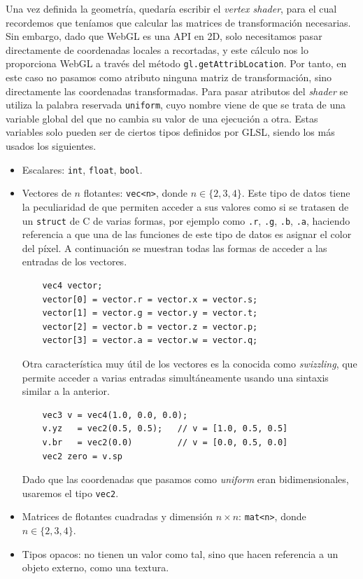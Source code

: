 Una vez definida la geometría, quedaría escribir el \textit{vertex shader}, para el cual recordemos que teníamos que calcular las matrices de transformación necesarias. Sin embargo, dado que WebGL es una API en 2D, solo necesitamos pasar directamente de coordenadas locales a recortadas, y este cálculo nos lo proporciona WebGL a través del método \texttt{gl.getAttribLocation}. Por tanto, en este caso no pasamos como atributo ninguna matriz de transformación, sino directamente las coordenadas transformadas. Para pasar atributos del \textit{shader} se utiliza la palabra reservada \texttt{uniform}, cuyo nombre viene de que se trata de una variable global del que no cambia su valor de una ejecución a otra. Estas variables solo pueden ser de ciertos tipos definidos por GLSL, siendo los más usados los siguientes.
\begin{itemize}
    \item Escalares: \texttt{int}, \texttt{float}, \texttt{bool}.
    \item Vectores de $n$ flotantes: \texttt{vec<n>}, donde $n\in \{2,3,4\}$. Este tipo de datos tiene la peculiaridad de que permiten acceder a sus valores como si se tratasen de un \texttt{struct} de C de varias formas, por ejemplo como \texttt{.r}, \texttt{.g}, \texttt{.b}, \texttt{.a}, haciendo referencia a que una de las funciones de este tipo de datos es asignar el color del píxel. A continuación se muestran todas las formas de acceder a las entradas de los vectores.
    \begin{lstlisting}
    vec4 vector;
    vector[0] = vector.r = vector.x = vector.s;
    vector[1] = vector.g = vector.y = vector.t;
    vector[2] = vector.b = vector.z = vector.p;
    vector[3] = vector.a = vector.w = vector.q;
    \end{lstlisting}
    Otra característica muy útil de los vectores es la conocida como \textit{swizzling}, que permite acceder a varias entradas simultáneamente usando una sintaxis similar a la anterior.
    \begin{lstlisting}
    vec3 v = vec4(1.0, 0.0, 0.0);
    v.yz   = vec2(0.5, 0.5);   // v = [1.0, 0.5, 0.5]
    v.br   = vec2(0.0)         // v = [0.0, 0.5, 0.0]
    vec2 zero = v.sp 
    \end{lstlisting}
    Dado que las coordenadas que pasamos como \textit{uniform} eran bidimensionales, usaremos el tipo \texttt{vec2}.
    \item Matrices de flotantes cuadradas y dimensión $n\times n$: \texttt{mat<n>},  donde $n\in \{2,3,4\}$.
    \item Tipos opacos: no tienen un valor como tal, sino que hacen referencia a un objeto externo, como una textura.
\end{itemize}

